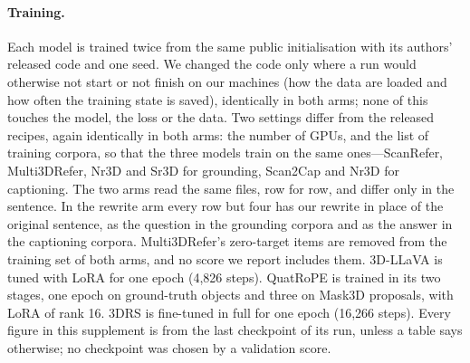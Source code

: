 \paragraph{Training.}
Each model is trained twice from the same public initialisation with its authors' released code and one seed.
We changed the code only where a run would otherwise not start or not finish on our machines (how the data are loaded and how often the training state is saved), identically in both arms; none of this touches the model, the loss or the data.
Two settings differ from the released recipes, again identically in both arms: the number of GPUs, and the list of training corpora, so that the three models train on the same ones---ScanRefer, Multi3DRefer, Nr3D and Sr3D for grounding, Scan2Cap and Nr3D for captioning.
The two arms read the same files, row for row, and differ only in the sentence.
In the rewrite arm every row but four has our rewrite in place of the original sentence, as the question in the grounding corpora and as the answer in the captioning corpora.
Multi3DRefer's zero-target items are removed from the training set of both arms, and no score we report includes them.
3D-LLaVA is tuned with LoRA for one epoch (4,826 steps).
QuatRoPE is trained in its two stages, one epoch on ground-truth objects and three on Mask3D proposals, with LoRA of rank 16.
3DRS is fine-tuned in full for one epoch (16,266 steps).
Every figure in this supplement is from the last checkpoint of its run, unless a table says otherwise; no checkpoint was chosen by a validation score.

